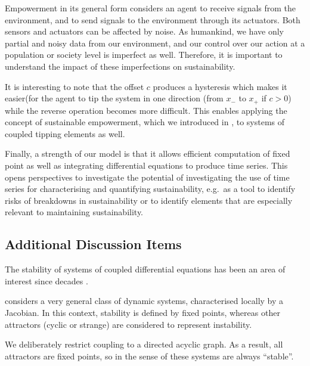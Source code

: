 \documentclass[letterpaper]{article}
\begin{document}
Empowerment in its general form considers an agent to receive signals
from the environment, and to send signals to the environment through
its actuators. Both sensors and actuators can be affected by noise. As
humankind, we have only partial and noisy data from our environment,
and our control over our action at a population or society level is
imperfect as well. Therefore, it is important to understand the impact
of these imperfections on sustainability.



It is interesting to note that the offset $c$ produces a hysteresis
which makes it easier(for the agent to tip the system in one direction
(from $x_{-}$ to $x_{+}$ if $c > 0$) while the reverse operation
becomes more difficult. This enables applying the concept of
sustainable empowerment, which we introduced in
\citet{Kim2009_sustainability}, to systems of coupled tipping elements
as well.

Finally, a strength of our model is that it allows efficient
computation of fixed point as well as integrating differential
equations to produce time series. This opens perspectives to
investigate the potential of investigating the use of time series for
characterising and quantifying sustainability, e.g.\ as a tool to
identify risks of breakdowns in sustainability or to identify elements
that are especially relevant to maintaining sustainability.


\subsection{Additional Discussion Items}

The stability of systems of coupled differential equations has been an
area of interest since decades
\citep{May1972_stablelargecomplexsystem,Landi2018_ecologicalnetworks}.

\citet{May1972_stablelargecomplexsystem} considers a very general
class of dynamic systems, characterised locally by a Jacobian. In this
context, stability is defined by fixed points, whereas other
attractors (cyclic or strange) are considered to represent
instability.

We deliberately restrict coupling to a directed acyclic graph. As a
result, all attractors are fixed points, so in the sense of
\citet{May1972_stablelargecomplexsystem} these systems are always
``stable''.
\end{document}
